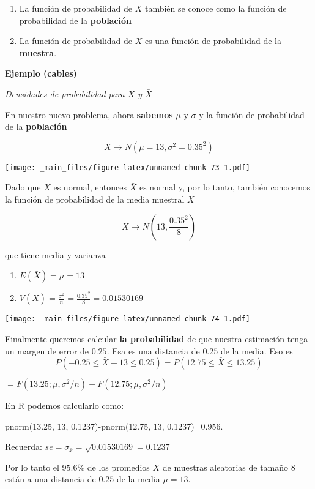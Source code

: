\documentclass[
]{book}
\providecommand{\tightlist}{%
  \setlength{\itemsep}{0pt}\setlength{\parskip}{0pt}}
\begin{document}
\begin{enumerate}
\def\labelenumi{\arabic{enumi}.}
\item
  La función de probabilidad de \(X\) también se conoce como la función de probabilidad de la \textbf{población}
\item
  La función de probabilidad de \(\bar{X}\) es una función de probabilidad de la \textbf{muestra}.
\end{enumerate}

\textbf{Ejemplo (cables)}

\emph{Densidades de probabilidad para \(X\) y \(\bar{X}\)}

En nuestro nuevo problema, ahora \textbf{sabemos} \(\mu\) y \(\sigma\) y la función de probabilidad de la \textbf{población}

\[X \rightarrow N(\mu=13, \sigma^2=0.35^2)\]

\texttt{[image: \_main\_files/figure-latex/unnamed-chunk-73-1.pdf]}

Dado que \(X\) es normal, entonces \(\bar{X}\) es normal y, por lo tanto, también conocemos la función de probabilidad de la media muestral \(\bar{X}\)

\[\bar{X} \rightarrow N(13, \frac{0.35^2}{8})\]

que tiene media y varianza

\begin{enumerate}
\def\labelenumi{\arabic{enumi})}
\tightlist
\item
  \(E(\bar{X})=\mu=13\)
\item
  \(V(\bar{X})=\frac{\sigma^2}{n}=\frac{0.35^2}{8}=0.01530169\)
\end{enumerate}

\texttt{[image: \_main\_files/figure-latex/unnamed-chunk-74-1.pdf]}

Finalmente queremos calcular \textbf{la probabilidad} de que nuestra estimación tenga un margen de error de \(0.25\). Esa es una distancia de \(0.25\) de la media. Eso es \[P(-0.25 \leq \bar{X} - 13\leq 0.25)=P(12.75 \leq \bar{X} \leq 13.25)\]

\(=F(13.25; \mu, \sigma^2/n)-F(12.75; \mu, \sigma^2/n)\)

En R podemos calcularlo como:

pnorm(13.25, 13, 0.1237)-pnorm(12.75, 13, 0.1237)=0.956.

Recuerda: \(se=\sigma_{\bar{x}}=\sqrt{0.01530169}=0.1237\)

Por lo tanto el \(95.6\%\) de los promedios \(\bar{X}\) de muestras aleatorias de tamaño \(8\) están a una distancia de \(0.25\) de la media \(\mu=13\).
\end{document}
